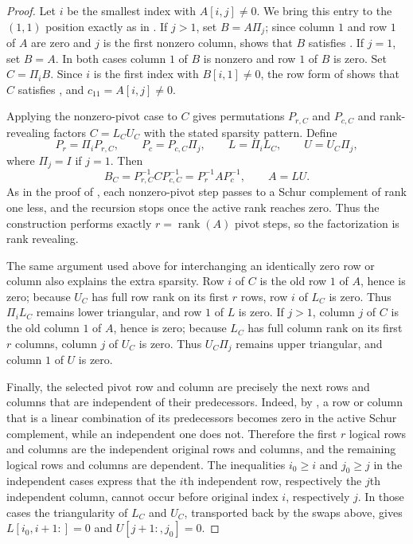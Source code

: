 \documentclass[10pt,twoside]{siamart1116}
\DeclareMathOperator{\rk}{rank}
\numberwithin{theorem}{section}
\begin{document}
\begin{proof}
  Let $i$ be the smallest index with $A[i,j] \neq 0$. We bring this entry to the $(1,1)$ position exactly as in . If $j > 1$, set $B = A\Pi_j$; since column $1$ and row $1$ of $A$ are zero and $j$ is the first nonzero column,  shows that $B$ satisfies . If $j=1$, set $B=A$. In both cases column $1$ of $B$ is nonzero and row $1$ of $B$ is zero. Set $C=\Pi_i B$. Since $i$ is the first index with $B[i,1]\neq0$, the row form of  shows that $C$ satisfies , and $c_{11}=A[i,j]\neq0$.

  Applying the nonzero-pivot case to $C$ gives permutations $P_{r,C}$ and $P_{c,C}$ and rank-revealing factors $C=L_CU_C$ with the stated sparsity pattern. Define
  \[
    P_r = \Pi_i P_{r,C}, \qquad
    P_c = P_{c,C}\Pi_j, \qquad
    L = \Pi_i L_C, \qquad
    U = U_C\Pi_j,
  \]
  where $\Pi_j=I$ if $j=1$. Then
  \[
    B_C = P_{r,C}^{-1} C P_{c,C}^{-1}
    = P_r^{-1} A P_c^{-1},
    \qquad
    A = LU.
  \]
  As in the proof of , each nonzero-pivot step passes to a Schur complement of rank one less, and the recursion stops once the active rank reaches zero. Thus the construction performs exactly $r = \rk(A)$ pivot steps, so the factorization is rank revealing.

  The same argument used above for interchanging an identically zero row or column also explains the extra sparsity. Row $i$ of $C$ is the old row $1$ of $A$, hence is zero; because $U_C$ has full row rank on its first $r$ rows, row $i$ of $L_C$ is zero. Thus $\Pi_i L_C$ remains lower triangular, and row $1$ of $L$ is zero. If $j>1$, column $j$ of $C$ is the old column $1$ of $A$, hence is zero; because $L_C$ has full column rank on its first $r$ columns, column $j$ of $U_C$ is zero. Thus $U_C\Pi_j$ remains upper triangular, and column $1$ of $U$ is zero.

  Finally, the selected pivot row and column are precisely the next rows and columns that are independent of their predecessors. Indeed, by , a row or column that is a linear combination of its predecessors becomes zero in the active Schur complement, while an independent one does not. Therefore the first $r$ logical rows and columns are the independent original rows and columns, and the remaining logical rows and columns are dependent. The inequalities $i_0 \ge i$ and $j_0 \ge j$ in the independent cases express that the $i$th independent row, respectively the $j$th independent column, cannot occur before original index $i$, respectively $j$. In those cases the triangularity of $L_C$ and $U_C$, transported back by the swaps above, gives $L[i_0,i+1:]=0$ and $U[j+1:,j_0]=0$.


\end{proof}
\end{document}
